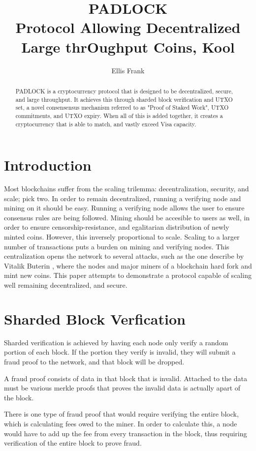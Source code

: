 \documentclass[12pt, letterpaper]{article}
\title{
    PADLOCK \\
    \large Protocol Allowing Decentralized Large thrOughput Coins, Kool
}
\author{Ellis Frank}
\begin{document}
\maketitle

\begin{abstract}
    PADLOCK is a cryptocurrency protocol that is designed to be decentralized,
    secure, and large throughput. It achieves this through sharded block
    verification and UTXO set, a novel consensensus mechanism referred to as
    "Proof of Staked Work", UTXO commitments, and UTXO expiry.  When all of this
    is added together, it creates a cryptocurrency that is able to match, and
    vastly exceed Visa capacity.
\end{abstract}

\section{Introduction}
Most blockchains suffer from the scaling trilemma: decentralization, security,
and scale; pick two. In order to remain decentralized, running a verifying node
and mining on it should be easy. Running a verifying node allows the user to
ensure consensus rules are being followed. Mining should be accesible to users
as well, in order to ensure censorship-resistance, and egalitarian distribution
of newly minted coins. However, this inversely proportional to scale. Scaling to
a larger number of transactions puts a burden on mining and verifying nodes.
This centralization opens the network to several attacks, such as the one
describe by Vitalik Buterin \cite{LimitToBlockchainScaling}, where the nodes and
major miners of a blockchain hard fork and mint new coins.  This paper attempts
to demonstrate a protocol capable of scaling well remaining decentralized, and
secure.

\section{Sharded Block Verfication}
Sharded verification is achieved by having each node only verify a random
portion of each block. If the portion they verify is invalid, they will submit a
fraud proof to the network, and that block will be dropped.

A fraud proof consists of data in that block that is invalid. Attached to the
data must be various merkle proofs that proves the invalid data is actually
apart of the block.

There is one type of fraud proof that would require verifying the entire block,
which is calculating fees owed to the miner. In order to calculate this, a node
would have to add up the fee from every transaction in the block, thus requiring
verification of the entire block to prove fraud.
\end{document}
